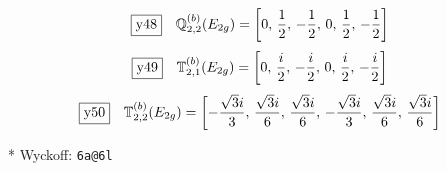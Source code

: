 \documentclass[fleqn,10pt,landscape]{jsarticle}
\begin{document}
\begin{dmath*}
\fbox{y48}\quad \mathbb{Q}_{2,2}^{(b)}(E_{2g})=\left[ 0,\, \frac{1}{2},\, - \frac{1}{2},\, 0,\, \frac{1}{2},\, - \frac{1}{2} \right]
\end{dmath*}
\begin{dmath*}
\fbox{y49}\quad \mathbb{T}_{2,1}^{(b)}(E_{2g})=\left[ 0,\, \frac{i}{2},\, - \frac{i}{2},\, 0,\, \frac{i}{2},\, - \frac{i}{2} \right]
\end{dmath*}
\begin{dmath*}
\fbox{y50}\quad \mathbb{T}_{2,2}^{(b)}(E_{2g})=\left[ - \frac{\sqrt{3} i}{3},\, \frac{\sqrt{3} i}{6},\, \frac{\sqrt{3} i}{6},\, - \frac{\sqrt{3} i}{3},\, \frac{\sqrt{3} i}{6},\, \frac{\sqrt{3} i}{6} \right]
\end{dmath*}
\vspace{5mm}

\noindent ** Wyckoff: \texttt{6a@6l}
\end{document}
